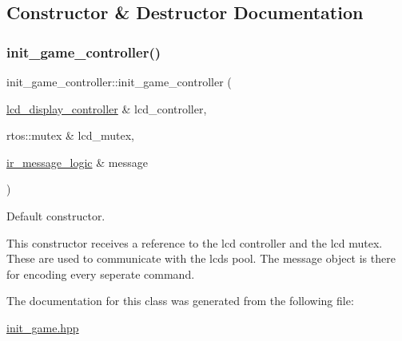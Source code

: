 \subsection{Constructor \& Destructor Documentation}
\hypertarget{classinit__game__controller_a8b506bc4f98428bbceca83027a41f184}{}\label{classinit__game__controller_a8b506bc4f98428bbceca83027a41f184} 
\subsubsection{\texorpdfstring{init\+\_\+game\+\_\+controller()}{init\_game\_controller()}}
{\footnotesize\ttfamily init\+\_\+game\+\_\+controller\+::init\+\_\+game\+\_\+controller (\begin{DoxyParamCaption}\item[{\hyperlink{classlcd__display__controller}{lcd\+\_\+display\+\_\+controller} \&}]{lcd\+\_\+controller,  }\item[{rtos\+::mutex \&}]{lcd\+\_\+mutex,  }\item[{\hyperlink{classir__message__logic}{ir\+\_\+message\+\_\+logic} \&}]{message }\end{DoxyParamCaption})\hspace{0.3cm}{\ttfamily [inline]}}



Default constructor. 

This constructor receives a reference to the lcd controller and the lcd mutex. These are used to communicate with the lcds pool. The message object is there for encoding every seperate command. 

The documentation for this class was generated from the following file\+:\begin{DoxyCompactItemize}
\item 
\hyperlink{init__game_8hpp}{init\+\_\+game.\+hpp}\end{DoxyCompactItemize}
